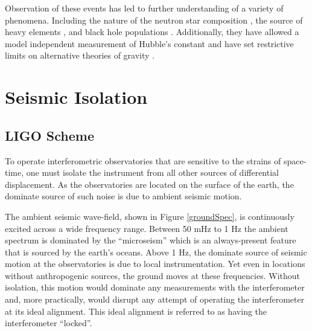 \documentclass [12pt, proquest]{uwthesis}[2019]
\begin{document}
Observation of these events has led to further understanding of a variety of phenomena. Including the nature of the neutron star composition \cite{NSEoS}, the source of heavy elements \cite{heavyElements}, and black hole populations \cite{GWTC}. Additionally, they have allowed a model independent measurement of Hubble's constant \cite{hubble1, hubble2} and have set restrictive limits on alternative theories of gravity \cite{speedGW}.

\section{Seismic Isolation}\label{seisIso}

\subsection{LIGO Scheme}

To operate interferometric observatories that are sensitive to the strains of space-time, one must isolate the instrument from all other sources of differential displacement. As the observatories are located on the surface of the earth, the dominate source of such noise is due to ambient seismic motion. 

The ambient seismic wave-field, shown in Figure \ref{groundSpec}, is continuously excited across a wide frequency range. Between 50 mHz to 1 Hz the ambient spectrum is dominated by the ``microseism'' which is an always-present feature that is sourced by the earth's oceans. Above 1 Hz, the dominate source of seismic motion at the observatories is due to local instrumentation. Yet even in locations without anthropogenic sources, the ground moves at these frequencies. Without isolation, this motion would dominate any measurements with the interferometer and, more practically, would disrupt any attempt of operating the interferometer at its ideal alignment. This ideal alignment is referred to as having the interferometer ``locked''.
\end{document}
